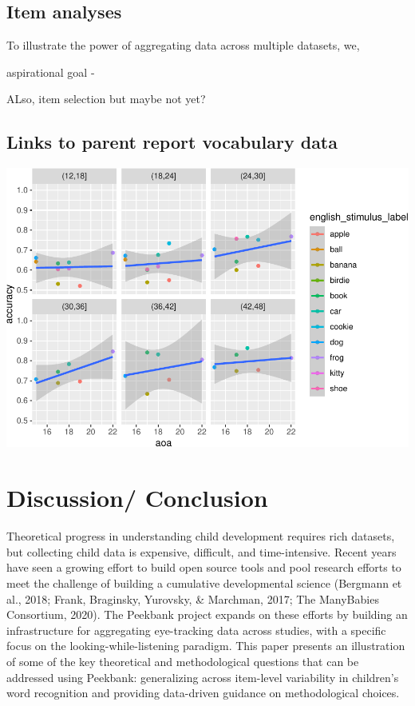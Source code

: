 \documentclass[
  english,
  man,floatsintext]{apa6}
\begin{document}
\hypertarget{item-analyses}{%
\subsection{Item analyses}\label{item-analyses}}

To illustrate the power of aggregating data across multiple datasets, we,

aspirational goal -

ALso, item selection but maybe not yet?

\hypertarget{links-to-parent-report-vocabulary-data}{%
\subsection{Links to parent report vocabulary data}\label{links-to-parent-report-vocabulary-data}}

\includegraphics{peekbank-brm_files/figure-latex/unnamed-chunk-6-1.pdf}

\hypertarget{discussion-conclusion}{%
\section{Discussion/ Conclusion}\label{discussion-conclusion}}

Theoretical progress in understanding child development requires rich datasets, but collecting child data is expensive, difficult, and time-intensive. Recent years have seen a growing effort to build open source tools and pool research efforts to meet the challenge of building a cumulative developmental science (Bergmann et al., 2018; Frank, Braginsky, Yurovsky, \& Marchman, 2017; The ManyBabies Consortium, 2020). The Peekbank project expands on these efforts by building an infrastructure for aggregating eye-tracking data across studies, with a specific focus on the looking-while-listening paradigm. This paper presents an illustration of some of the key theoretical and methodological questions that can be addressed using Peekbank: generalizing across item-level variability in children's word recognition and providing data-driven guidance on methodological choices.
\end{document}
